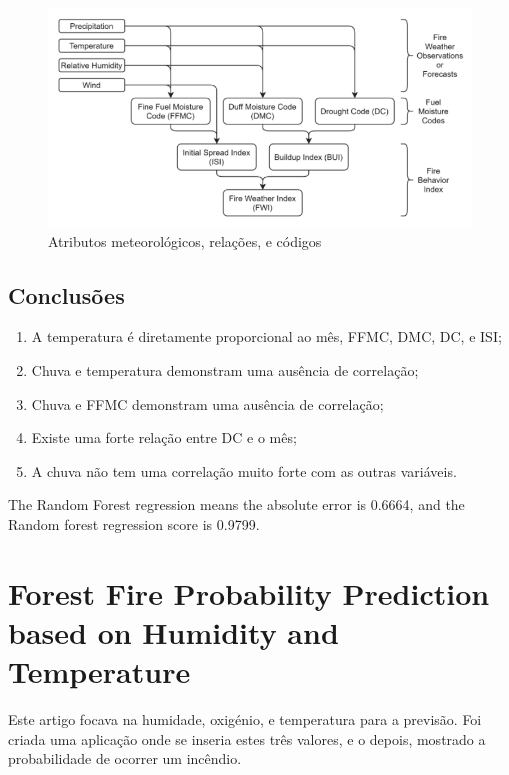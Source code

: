 \documentclass{article}
\begin{document}
\begin{figure}[H]
 \centering
  \includegraphics[width=0.70\linewidth]{imgs/fwi_structure.png}
   \caption{\label{fig:fwi_structure}Atributos meteorológicos, relações, e códigos}
\end{figure}


\subsection{Conclusões}
\begin{enumerate}
    \item A temperatura é diretamente proporcional ao mês, FFMC, DMC, DC, e ISI;
    \item Chuva e temperatura demonstram uma ausência de correlação;
    \item Chuva e FFMC demonstram uma ausência de correlação;
    \item Existe uma forte relação entre DC e o mês;
    \item A chuva não tem uma correlação muito forte com as outras variáveis.
\end{enumerate}

The Random Forest regression means the absolute error 
is 0.6664, and the Random forest regression score is 0.9799.



\section{Forest Fire Probability Prediction based on Humidity and Temperature \cite{10085661}}
\label{sec:Forest Fire Probability Prediction based on Humidity and Temperature}
Este artigo focava na humidade, oxigénio, e temperatura para a previsão. Foi criada uma aplicação onde se inseria estes três valores, e o depois, mostrado a probabilidade de ocorrer um incêndio.   
\end{document}
